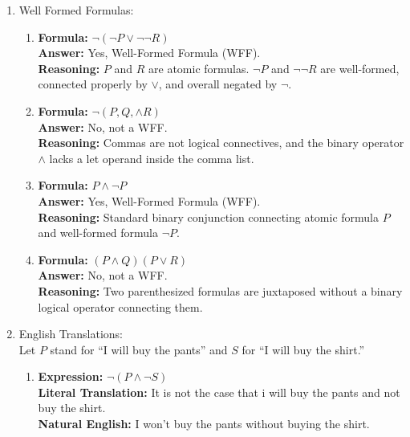 \begin{enumerate}
\begin{enumerate}
  \item \textbf{Statement:} Neither Alice nor Bob is in the room. \\
    \textbf{Logical Form:} $\neg(A \lor B)$ \\
    \textbf{Reasoning:} Denies that either Alice or Bob is in the room.
  \end{enumerate}

\item Well Formed Formulas:
  \begin{enumerate}
  \item \textbf{Formula:} $\neg(\neg P \lor \neg \neg R)$ \\
    \textbf{Answer:} Yes, Well-Formed Formula (WFF). \\
    \textbf{Reasoning:} $P$ and $R$ are atomic formulas. $\neg P$ and $\neg \neg R$ are well-formed, connected properly by $\lor$, and overall negated by $\neg$.

  \item \textbf{Formula:} $\neg(P, Q, \land R)$ \\
    \textbf{Answer:} No, not a WFF. \\
    \textbf{Reasoning:} Commas are not logical connectives, and the binary operator $\land$ lacks a let operand inside the comma list.

  \item \textbf{Formula:} $P \land \neg P$ \\
    \textbf{Answer:} Yes, Well-Formed Formula (WFF). \\
    \textbf{Reasoning:} Standard binary conjunction connecting atomic formula $P$ and well-formed formula $\neg P$.

  \item \textbf{Formula:} $(P \land Q) (P \lor R)$ \\
    \textbf{Answer:} No, not a WFF. \\
    \textbf{Reasoning:} Two parenthesized formulas are juxtaposed without a binary logical operator connecting them.
  \end{enumerate}

\item English Translations: \\
  Let $P$ stand for ``I will buy the pants'' and $S$ for ``I will buy the shirt.''
  \begin{enumerate}
  \item \textbf{Expression:} $\neg(P \land \neg S)$ \\
    \textbf{Literal Translation:} It is not the case that i will buy the pants and not buy the shirt. \\
    \textbf{Natural English:} I won't buy the pants without buying the shirt.


\end{enumerate}
\end{enumerate}
